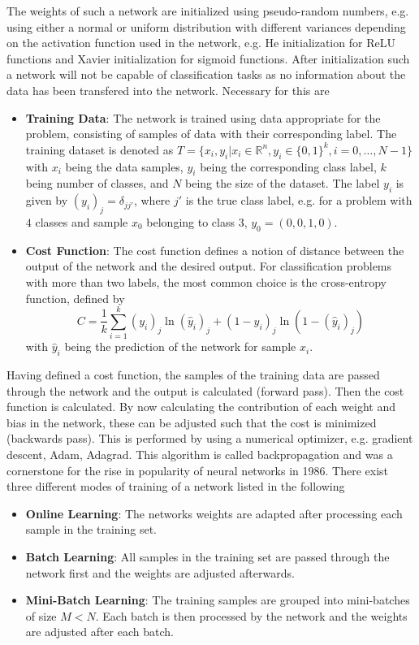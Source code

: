 The weights of such a network are initialized using pseudo-random numbers, e.g. using either a normal or uniform distribution with different variances depending on the activation function used in the network, e.g. He initialization \cite{He2015} for ReLU functions and Xavier initialization \cite{Glorot2010} for sigmoid functions. After initialization such a network will not be capable of classification tasks as no information about the data has been transfered into the network. Necessary for this are 
\begin{itemize}
\item \textbf{Training Data}: The network is trained using data appropriate for the problem, consisting of samples of data with their corresponding label. The training dataset is denoted as $T = \{x_i, y_i | x_i\in \mathbb{R}^n, y_i \in \{0,1\}^k, i=0,\dots,N-1\}$ with $x_i$ being the data samples, $y_i$ being the corresponding class label, $k$ being number of classes, and $N$ being the size of the dataset. The label $y_i$ is given by $(y_i)_j=\delta_{jj'}$, where  $j'$ is the true class label, e.g. for a problem with $4$ classes and sample $x_0$ belonging to class $3$, $y_0 = (0,0,1,0)$.
\item \textbf{Cost Function}: The cost function defines a notion of distance between the output of the network and the desired output. For classification problems with more than two labels, the most common choice is the cross-entropy function, defined by
\begin{equation}
C = \frac{1}{k} \sum_{i=1}^k (y_i)_j \ln{(\hat{y}_i)_j} + (1-y_i)_j \ln{(1-(\hat{y}_i)_j)} 
\end{equation}
with $\hat{y}_i$ being the prediction of the network for sample $x_i$.
\end{itemize}
Having defined a cost function, the samples of the training data are passed through the network and the output is calculated (forward pass). Then the cost function is calculated. By now calculating the contribution of each weight and bias in the network, these can be adjusted such that the cost is minimized (backwards pass). This is performed by using a numerical optimizer, e.g. gradient descent, Adam, Adagrad. This algorithm is called backpropagation \cite{Rumelhart1986} and was a cornerstone for the rise in popularity of neural networks in 1986. There exist three different modes of training of a network listed in the following
\begin{itemize}
\item \textbf{Online Learning}: The networks weights are adapted after processing each sample in the training set.
\item \textbf{Batch Learning}: All samples in the training set are passed through the network first and the weights are adjusted afterwards.
\item \textbf{Mini-Batch Learning}: The training samples are grouped into mini-batches of size $M<N$. Each batch is then processed by the network and the weights are adjusted after each batch.
\end{itemize}
